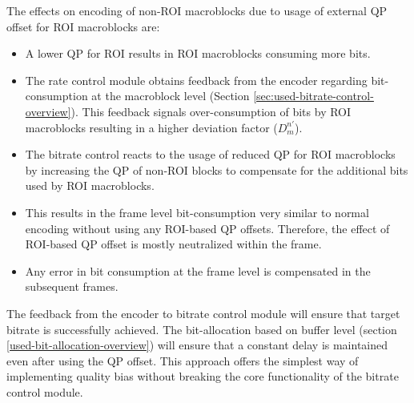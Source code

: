 \documentclass[11pt]{article} %
\begin{document}
The effects on encoding of non-ROI macroblocks due to usage of external QP offset for ROI macroblocks are:
\begin{itemize}
	\item A lower QP for ROI results in ROI macroblocks consuming more bits.
	\item The rate control module obtains feedback from the encoder regarding bit-consumption at the macroblock level (Section \ref{sec:used-bitrate-control-overview}). This feedback signals over-consumption of bits by ROI macroblocks resulting in a higher deviation factor ($D_m^{n'}$).
	\item The bitrate control reacts to the usage of reduced QP for ROI macroblocks by increasing the QP of non-ROI blocks to compensate for the additional bits used by ROI macroblocks. 
	\item This results in the frame level bit-consumption very similar to normal encoding without using any ROI-based QP offsets. Therefore, the effect of ROI-based QP offset is mostly neutralized within the frame.
	\item Any error in bit consumption at the frame level is compensated in the subsequent frames.
\end{itemize}
The feedback from the encoder to bitrate control module will ensure that target bitrate is successfully achieved. The bit-allocation based on buffer level (section \ref{used-bit-allocation-overview}) will ensure that a constant delay is maintained even after using the QP offset. This approach offers the simplest way of implementing quality bias without breaking the core functionality of the bitrate control module.  
\end{document}
